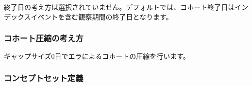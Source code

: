 \documentclass[
  11pt]{book}
\theoremstyle{definition}
\theoremstyle{definition}
\theoremstyle{definition}
\theoremstyle{definition}
\theoremstyle{remark}
\begin{document}
終了日の考え方は選択されていません。デフォルトでは、コホート終了日はインデックスイベントを含む観察期間の終了日となります。

\subsubsection*{コホート圧縮の考え方}\label{ux30b3ux30dbux30fcux30c8ux5727ux7e2eux306eux8003ux3048ux65b9-1}

ギャップサイズ0日でエラによるコホートの圧縮を行います。

\subsubsection*{コンセプトセット定義}\label{ux30b3ux30f3ux30bbux30d7ux30c8ux30bbux30c3ux30c8ux5b9aux7fa9-3}
\end{document}
